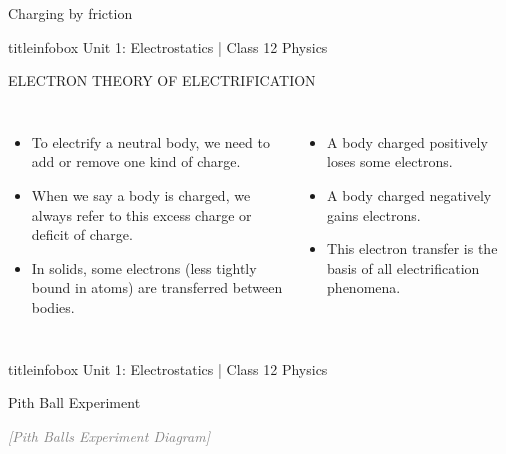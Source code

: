 \begin{frame}
\begin{frame}{Charging by friction}
    \begin{beamercolorbox}[wd=\textwidth,ht=0.5cm,dp=0.1cm,center]{titleinfobox}
        \small\color{coolgray} Unit 1: Electrostatics | Class 12 Physics
    \end{beamercolorbox}
\end{frame}

\begin{frame}{ELECTRON THEORY OF ELECTRIFICATION}
    \begin{columns}
        \begin{itemize}
        \item To electrify a neutral body, we need to add or remove one kind of charge.
            
            \item When we say a body is charged, we always refer to this excess charge or deficit of charge.
            
            \item In solids, some electrons (less tightly bound in atoms) are transferred between bodies.
        \end{itemize}
        
        \begin{itemize}
        \item A body charged positively loses some electrons.
            
            \item A body charged negatively gains electrons.
            
            \item This electron transfer is the basis of all electrification phenomena.
        \end{itemize}
    \end{columns}
    
    \vfill
    
    \begin{beamercolorbox}[wd=\textwidth,ht=0.5cm,dp=0.1cm,center]{titleinfobox}
        \small\color{coolgray} Unit 1: Electrostatics | Class 12 Physics
    \end{beamercolorbox}
\end{frame}

\begin{frame}{Pith Ball Experiment}
    \begin{center}
        \textcolor{gray}{\textit{[Pith Balls Experiment Diagram]}}
    \end{center}
    

\end{frame}
\end{frame}
